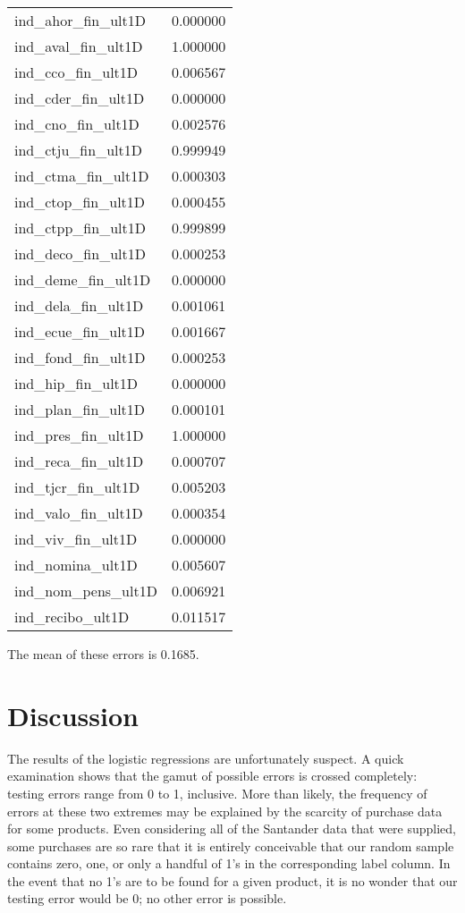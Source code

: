 \documentclass{report}
\begin{document}
\begin{tabular}{l r}
	ind\_ahor\_fin\_ult1D  &  0.000000 \\
	ind\_aval\_fin\_ult1D  &  1.000000 \\
	ind\_cco\_fin\_ult1D   &  0.006567 \\
	ind\_cder\_fin\_ult1D  &  0.000000 \\
	ind\_cno\_fin\_ult1D   &  0.002576 \\
	ind\_ctju\_fin\_ult1D  &  0.999949 \\
	ind\_ctma\_fin\_ult1D  &  0.000303 \\
	ind\_ctop\_fin\_ult1D  &  0.000455 \\
	ind\_ctpp\_fin\_ult1D  &  0.999899 \\
	ind\_deco\_fin\_ult1D  &  0.000253 \\
	ind\_deme\_fin\_ult1D  &  0.000000 \\
	ind\_dela\_fin\_ult1D  &  0.001061 \\
	ind\_ecue\_fin\_ult1D  &  0.001667 \\
	ind\_fond\_fin\_ult1D  &  0.000253 \\
	ind\_hip\_fin\_ult1D   &  0.000000 \\
	ind\_plan\_fin\_ult1D  &  0.000101 \\
	ind\_pres\_fin\_ult1D  &  1.000000 \\
	ind\_reca\_fin\_ult1D  &  0.000707 \\
	ind\_tjcr\_fin\_ult1D  &  0.005203 \\
	ind\_valo\_fin\_ult1D  &  0.000354 \\
	ind\_viv\_fin\_ult1D   &  0.000000 \\
	ind\_nomina\_ult1D    &  0.005607 \\
	ind\_nom\_pens\_ult1D  &  0.006921 \\
	ind\_recibo\_ult1D    &  0.011517 \\
\end{tabular}

The mean of these errors is 0.1685.

\section{Discussion}

The results of the logistic regressions are unfortunately suspect. A quick examination shows that the gamut of possible errors is crossed completely: testing errors range from 0 to 1, inclusive. More than likely, the frequency of errors at these two extremes may be explained by the scarcity of purchase data for some products. Even considering all of the Santander data that were supplied, some purchases are so rare that it is entirely conceivable that our random sample contains zero, one, or only a handful of 1's in the corresponding label column. In the event that no 1's are to be found for a given product, it is no wonder that our testing error would be 0; no other error is possible.
\end{document}
